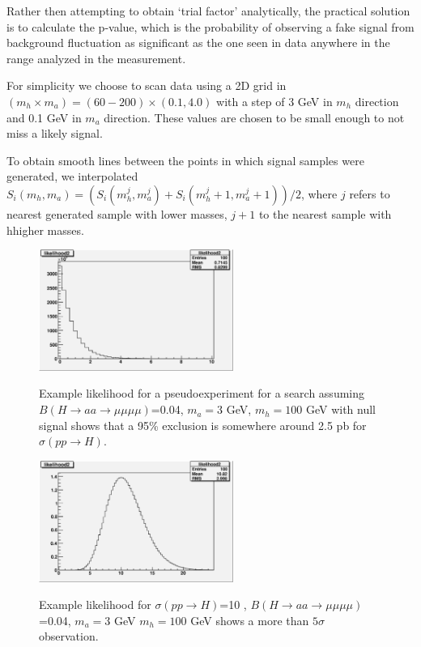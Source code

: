 \documentclass[aps,prd,onecolumn,superscriptaddress,showpacs]{revtex4}
\begin{document}
Rather then attempting to obtain `trial factor' analytically, the practical solution is to calculate the p-value, which is 
the probability of observing a fake signal from background fluctuation as significant as the one seen in data anywhere 
in the range analyzed in the measurement.

For simplicity we choose to scan data using a 2D grid in $(m_h \times m_a) = (60 - 200) \times (0.1, 4.0)$ with a step of 
3 GeV in $m_h$ direction and 0.1 GeV in $m_a$ direction. These values are chosen to be small enough to not miss a likely
signal.

To obtain smooth lines between the points in 
which signal samples were generated, we interpolated $S_i(m_h, m_a) = (S_i(m_h^j, m_a^j) + S_i(m_h^j+1,
m_a^j+1))/2$, where $j$ refers to nearest generated sample with lower masses, $j+1$ to the nearest sample with
hhigher masses.

\begin{figure}[htb]
\begin{center}
\includegraphics[width=15pc]{plots/likelihood_NoSignal.eps}
\caption{Example likelihood for a pseudoexperiment for a search assuming $B(H \to aa \to \mu \mu \mu \mu)$=0.04, 
$m_a=3$ GeV, $m_h= 100$ GeV with null signal shows that a 95\% exclusion is somewhere around 2.5 pb for  
$\sigma (pp \to H)$.}
\label{likelihood_null}
\includegraphics[width=15pc]{plots/likelihood_H100_a3_10pb.eps}
\caption{Example likelihood for $\sigma (pp \to H)$=10 \ipb, $B(H \to aa \to \mu \mu \mu \mu)$=0.04, $m_a=3$ GeV 
$m_h= 100$ GeV shows a more than $5 \sigma$ observation.}
\label{likelihood_10pb}
\end{center}
\end{figure}
\end{document}
